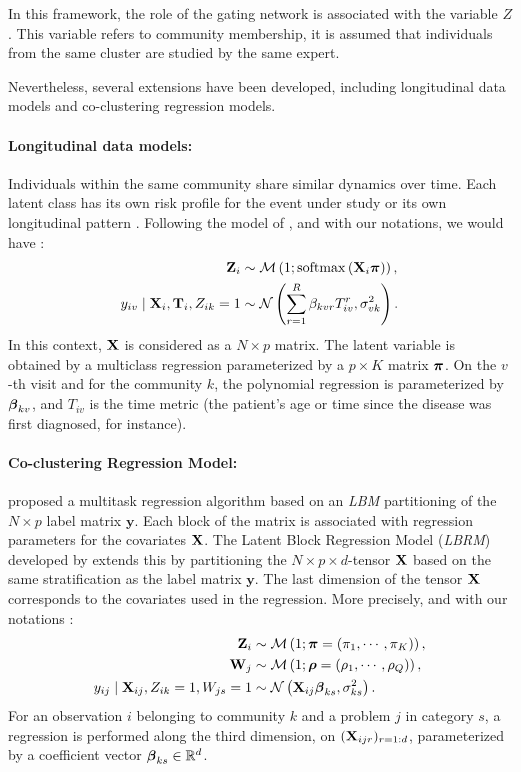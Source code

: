 In this framework, the role of the gating network is associated with the variable $Z$. This variable refers to community membership, it is assumed that individuals from the same cluster are studied by the same expert.


Nevertheless, several extensions have been developed, including longitudinal data models and co-clustering regression models.

\paragraph{Longitudinal data models:} Individuals within the same community share similar dynamics over time. Each latent class has its own risk profile for the event under study or its own longitudinal pattern \citep{proust2014joint, courbariaux2022sparse}.
Following the model of \cite{courbariaux2022sparse}, and with our notations, we would have :
\begin{align}
    \mathbf{Z}_i &\sim \operatorname{\mathcal{M}}\left(1; \operatorname{softmax}\left(\mathbf{X}_i \boldsymbol{\pi} \right)\right), \\
    y_{iv} \mid \mathbf{X}_i, \mathbf{T}_i, Z_{ik}=1 &\sim \mathcal{N}\left( \sum_{r=1}^R  \beta_{kvr} T_{iv}^r , \sigma^2_{vk}\right).
\end{align}
In this context, $\mathbf{X}$ is considered as a $N \times p$ matrix. The latent variable is obtained by a multiclass regression parameterized  by a $p \times K$ matrix $\boldsymbol{\pi}$.
On the $v$-th visit and for the community $k$, the polynomial regression is parameterized by $\boldsymbol{\beta}_{kv}$, and $T_{iv}$ is the time metric (the
patient’s age or time since the disease was first diagnosed, for instance).
 
\paragraph{Co-clustering Regression Model:} \cite{vu2015variational} proposed a multitask regression algorithm based on an \textit{LBM} partitioning of the $N \times p$ label matrix $\mathbf{y}$.
Each block of the matrix is associated with regression parameters for the covariates $\mathbf{X}$. The Latent Block Regression Model (\textit{LBRM}) developed by \cite{boutalbi2022latent} extends this by partitioning the $N \times p \times d$-tensor $\mathbf{X}$ based on the same stratification as the label matrix $\mathbf{y}$. The last dimension of the tensor $\mathbf{X}$ corresponds to the covariates used in the regression.
More precisely, and with our notations :
%
\begin{align}
    \mathbf{Z}_i &\sim \operatorname{\mathcal{M}}\left(1; \boldsymbol{\pi} = \left(\pi_1, \cdots, \pi_K\right) \right), \\
    \mathbf{W}_j &\sim \operatorname{\mathcal{M}}\left(1; \boldsymbol{\rho} = \left(\rho_1, \cdots, \rho_Q\right) \right), \\
    y_{ij} \mid \mathbf{X}_{ij}, Z_{ik}=1, W_{js}=1 &\sim \mathcal{N}\left(\mathbf{X}_{ij} \boldsymbol{\beta}_{ks}, \sigma^2_{ks}\right).
\end{align}
 For an observation \( i \) belonging to community \( k \) and a problem \( j \) in category \( s \), a regression is performed along the third dimension, on $(\mathbf{X}_{ijr})_{r=1:d}$, parameterized by a coefficient vector \( \boldsymbol{\beta}_{ks} \in \mathbb{R}^d \).


